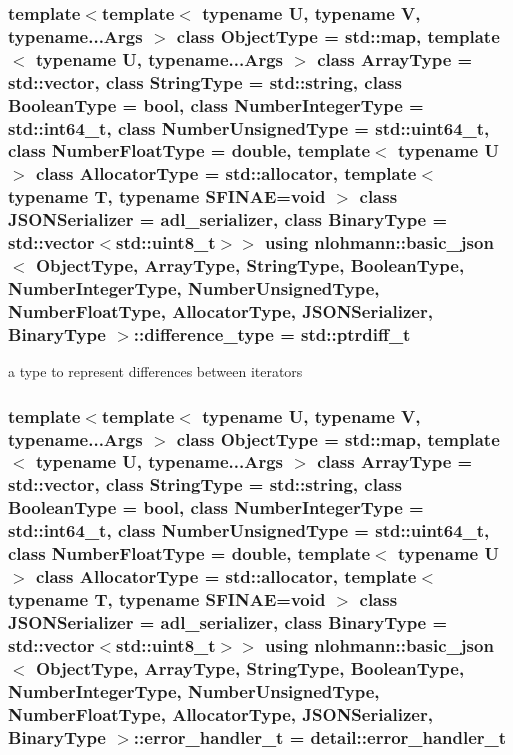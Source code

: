\subsubsection[{\texorpdfstring{difference\+\_\+type}{difference_type}}]{\setlength{\rightskip}{0pt plus 5cm}template$<$template$<$ typename U, typename V, typename...\+Args $>$ class Object\+Type = std\+::map, template$<$ typename U, typename...\+Args $>$ class Array\+Type = std\+::vector, class String\+Type  = std\+::string, class Boolean\+Type  = bool, class Number\+Integer\+Type  = std\+::int64\+\_\+t, class Number\+Unsigned\+Type  = std\+::uint64\+\_\+t, class Number\+Float\+Type  = double, template$<$ typename U $>$ class Allocator\+Type = std\+::allocator, template$<$ typename T, typename S\+F\+I\+N\+A\+E=void $>$ class J\+S\+O\+N\+Serializer = adl\+\_\+serializer, class Binary\+Type  = std\+::vector$<$std\+::uint8\+\_\+t$>$$>$ using {\bf nlohmann\+::basic\+\_\+json}$<$ Object\+Type, Array\+Type, String\+Type, Boolean\+Type, Number\+Integer\+Type, Number\+Unsigned\+Type, Number\+Float\+Type, Allocator\+Type, J\+S\+O\+N\+Serializer, Binary\+Type $>$\+::{\bf difference\+\_\+type} =  std\+::ptrdiff\+\_\+t}\hypertarget{classnlohmann_1_1basic__json_a3d20d11e5dfe95084a76f62eca54fadd}{}\label{classnlohmann_1_1basic__json_a3d20d11e5dfe95084a76f62eca54fadd}


a type to represent differences between iterators 

\subsubsection[{\texorpdfstring{error\+\_\+handler\+\_\+t}{error_handler_t}}]{\setlength{\rightskip}{0pt plus 5cm}template$<$template$<$ typename U, typename V, typename...\+Args $>$ class Object\+Type = std\+::map, template$<$ typename U, typename...\+Args $>$ class Array\+Type = std\+::vector, class String\+Type  = std\+::string, class Boolean\+Type  = bool, class Number\+Integer\+Type  = std\+::int64\+\_\+t, class Number\+Unsigned\+Type  = std\+::uint64\+\_\+t, class Number\+Float\+Type  = double, template$<$ typename U $>$ class Allocator\+Type = std\+::allocator, template$<$ typename T, typename S\+F\+I\+N\+A\+E=void $>$ class J\+S\+O\+N\+Serializer = adl\+\_\+serializer, class Binary\+Type  = std\+::vector$<$std\+::uint8\+\_\+t$>$$>$ using {\bf nlohmann\+::basic\+\_\+json}$<$ Object\+Type, Array\+Type, String\+Type, Boolean\+Type, Number\+Integer\+Type, Number\+Unsigned\+Type, Number\+Float\+Type, Allocator\+Type, J\+S\+O\+N\+Serializer, Binary\+Type $>$\+::{\bf error\+\_\+handler\+\_\+t} =  {\bf detail\+::error\+\_\+handler\+\_\+t}}\hypertarget{classnlohmann_1_1basic__json_a1e7ca76cc3f62626b380be5e18a002d5}{}\label{classnlohmann_1_1basic__json_a1e7ca76cc3f62626b380be5e18a002d5}


